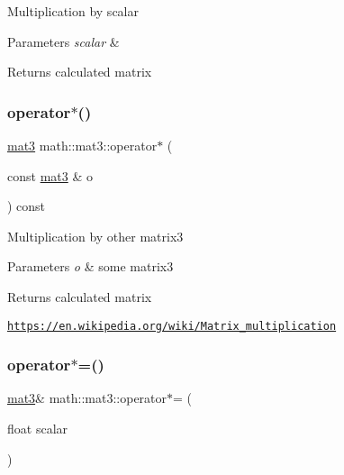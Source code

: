 Multiplication by scalar 
\begin{DoxyParams}{Parameters}
{\em scalar} & \\
\hline
\end{DoxyParams}
\begin{DoxyReturn}{Returns}
calculated matrix 
\end{DoxyReturn}
\mbox{\label{structmath_1_1mat3_ac2b79520ded1348a8daaa11cada2a633}} 
\subsubsection{\texorpdfstring{operator$\ast$()}{operator*()}\hspace{0.1cm}{\footnotesize\ttfamily [2/2]}}
{\footnotesize\ttfamily \hyperlink{structmath_1_1mat3}{mat3} math\+::mat3\+::operator$\ast$ (\begin{DoxyParamCaption}\item[{const \hyperlink{structmath_1_1mat3}{mat3} \&}]{o }\end{DoxyParamCaption}) const\hspace{0.3cm}{\ttfamily [inline]}}

Multiplication by other matrix3 
\begin{DoxyParams}{Parameters}
{\em o} & some matrix3 \\
\hline
\end{DoxyParams}
\begin{DoxyReturn}{Returns}
calculated matrix
\end{DoxyReturn}
\href{https://en.wikipedia.org/wiki/Matrix_multiplication}{\tt https\+://en.\+wikipedia.\+org/wiki/\+Matrix\+\_\+multiplication} \mbox{\label{structmath_1_1mat3_a9cf55c93334087cdbece61620de3e68a}} 
\subsubsection{\texorpdfstring{operator$\ast$=()}{operator*=()}\hspace{0.1cm}{\footnotesize\ttfamily [1/2]}}
{\footnotesize\ttfamily \hyperlink{structmath_1_1mat3}{mat3}\& math\+::mat3\+::operator$\ast$= (\begin{DoxyParamCaption}\item[{float}]{scalar }\end{DoxyParamCaption})\hspace{0.3cm}{\ttfamily [inline]}}

